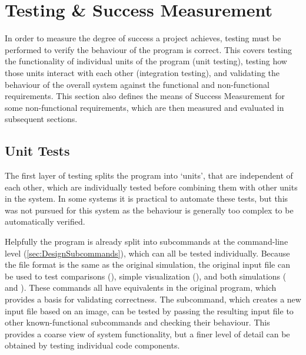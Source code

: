 \chapter{Testing \& Success Measurement}\label{sec:Testing}
In order to measure the degree of success a project achieves, testing must be performed to verify the behaviour of the program is correct.
This covers testing the functionality of individual units of the program (unit testing), testing how those units interact with each other (integration testing), and validating the behaviour of the overall system against the functional and non-functional requirements\cite{LevelsOfTesting}.
This section also defines the means of Success Measurement for some non-functional requirements, which are then measured and evaluated in subsequent sections.%

\section{Unit Tests}
The first layer of testing splits the program into `units', that are independent of each other, which are individually tested before combining them with other units in the system.
In some systems it is practical to automate these tests, but this was not pursued for this system as the behaviour is generally too complex to be automatically verified.

Helpfully the program is already split into subcommands at the command-line level (\cref{sec:DesignSubcommands}), which can all be tested individually.
Because the file format is the same as the original simulation, the original input file can be used to test comparisons (), simple visualization (), and both simulations ( and ).
These commands all have equivalents in the original program, which provides a basis for validating correctness.
The  subcommand, which creates a new input file based on an image, can be tested by passing the resulting input file to other known-functional subcommands and checking their behaviour.
This provides a coarse view of system functionality, but a finer level of detail can be obtained by testing individual code components.

